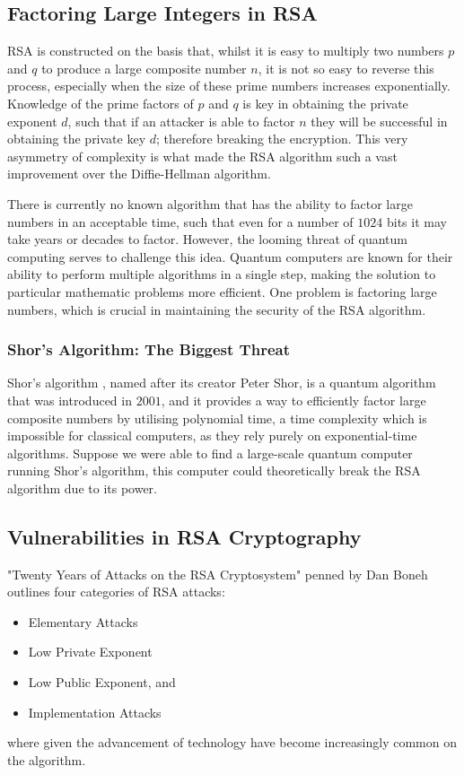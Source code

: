 \documentclass{article}
\begin{document}
\subsection{Factoring Large Integers in RSA}
RSA is constructed on the basis that, whilst it is easy to multiply two numbers $p$ and $q$ to produce a large composite number $n$, it is not so easy to reverse this process, especially when the size of these prime numbers increases exponentially. Knowledge of the prime factors of $p$ and $q$ is key in obtaining the private exponent $d$, such that if an attacker is able to factor $n$ they will be successful in obtaining the private key $d$; therefore breaking the encryption. This very asymmetry of complexity is what made the RSA algorithm such a vast improvement over the Diffie-Hellman algorithm. 

There is currently no known algorithm that has the ability to factor large numbers in an acceptable time, such that even for a number of $1024$ bits it may take years or decades to factor. However, the looming threat of quantum computing serves to challenge this idea. Quantum computers are known for their ability to perform multiple algorithms in a single step, making the solution to particular mathematic problems more efficient. One problem is factoring large numbers, which is crucial in maintaining the security of the RSA algorithm. 

\subsubsection{Shor's Algorithm: The Biggest Threat}
Shor's algorithm \cite{shor}, named after its creator Peter Shor, is a quantum algorithm that was introduced in $2001$, and it provides a way to efficiently factor large composite numbers by utilising polynomial time, a time complexity which is impossible for classical computers, as they rely purely on exponential-time algorithms. Suppose we were able to find a large-scale quantum computer running Shor's algorithm, this computer could theoretically break the RSA algorithm due to its power.
 
\subsection{Vulnerabilities in RSA Cryptography}
"Twenty Years of Attacks on the RSA Cryptosystem" penned by Dan Boneh \cite{attacks} outlines four categories of RSA attacks:
\begin{itemize}
    \item Elementary Attacks 
    \item Low Private Exponent 
    \item Low Public Exponent, and
    \item Implementation Attacks 
\end{itemize}
where given the advancement of technology have become increasingly common on the algorithm.
\end{document}
